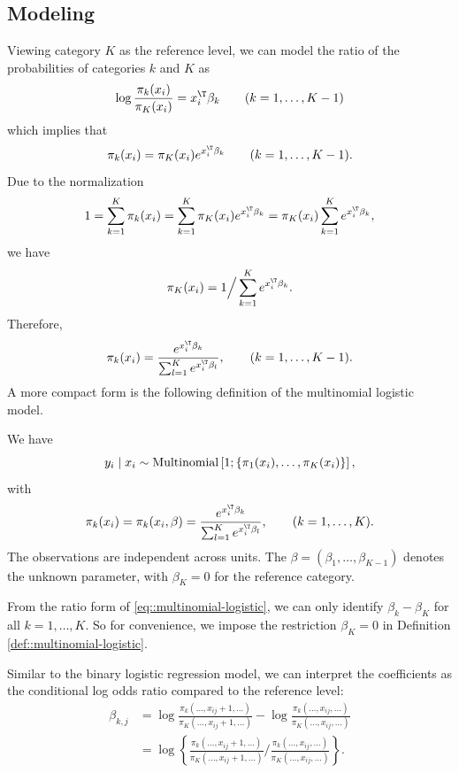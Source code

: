 \subsection{Modeling}
Viewing category $K$ as the reference level, we can model the ratio of
the probabilities of categories $k$ and $K$ as
\[
\log\frac{\pi_{k}(x_{i})}{\pi_{K}(x_{i})}=x_{i}^{\T}\beta_{k}\qquad(k=1,\ldots,K-1)
\]
which implies that 
\[
\pi_{k}(x_{i})=\pi_{K}(x_{i})e^{x_{i}^{\T}\beta_{k}}\qquad(k=1,\ldots,K-1).
\]
Due to the normalization 
$$
1 = \sum_{k=1}^{K}\pi_{k}(x_{i})
= \sum_{k=1}^{K}\pi_{K}(x_{i})e^{x_{i}^{\T}\beta_{k}}
= \pi_{K}(x_{i})\sum_{k=1}^{K}e^{x_{i}^{\T}\beta_{k}},
$$
we have
$$
\pi_{K}(x_{i})
=
1\Big/\sum_{k=1}^{K}e^{x_{i}^{\T}\beta_{k}} .
$$
Therefore, 
$$
\pi_{k}(x_{i})
=
\frac{e^{x_{i}^{\T}\beta_{k}}}{\sum_{ l =1}^{K}e^{x_{i}^{\T}\beta_{ l }}} ,\qquad  (k=1,\ldots,K-1).
$$
A more compact form is the following definition of the multinomial logistic model.


\begin{definition}
\label{def::multinomial-logistic}
We have
\[
y_{i}\mid x_{i}\sim\textup{Multinomial}\left[1;\left\{ \pi_{1}(x_{i}),\ldots,\pi_{K}(x_{i})\right\} \right],
\]
with 
\begin{eqnarray}
\pi_{k}(x_{i})=\pi_{k}(x_{i},\beta)=\frac{e^{x_{i}^{\T}\beta_{k}}}{\sum_{ l =1}^{K}e^{x_{i}^{\T}\beta_{ l }}},\qquad(k=1,\ldots,K) . 
\label{eq::multinomial-logistic}
\end{eqnarray}
The observations are independent across units. The $\beta=(\beta_{1},\ldots,\beta_{K-1})$ denotes the unknown parameter,
with $\beta_{K}=0$ for the reference category. 
\end{definition}

From the ratio form of \eqref{eq::multinomial-logistic}, we can only identify $\beta_k - \beta_K$ for all $k= 1,\ldots, K$. So for convenience, we impose the restriction $\beta_{K}=0$ in Definition \ref{def::multinomial-logistic}.




Similar to the binary logistic regression model, we can interpret the coefficients as the conditional log odds ratio compared to the reference level:
\begin{align*}
\beta_{k,j} & =\log\frac{\pi_{k}( \ldots,x_{ij}+1,\ldots )}{\pi_{K}( \ldots,x_{ij}+1,\ldots )}-\log\frac{\pi_{k}( \ldots,x_{ij},\ldots )}{\pi_{K}( \ldots,x_{ij},\ldots )}\\
 & =\log\left\{ \frac{\pi_{k}( \ldots,x_{ij}+1,\ldots )}{\pi_{K}( \ldots,x_{ij}+1,\ldots )}\Big/\frac{\pi_{k}( \ldots,x_{ij},\ldots )}{\pi_{K}( \ldots,x_{ij},\ldots )}\right\} .
\end{align*}


